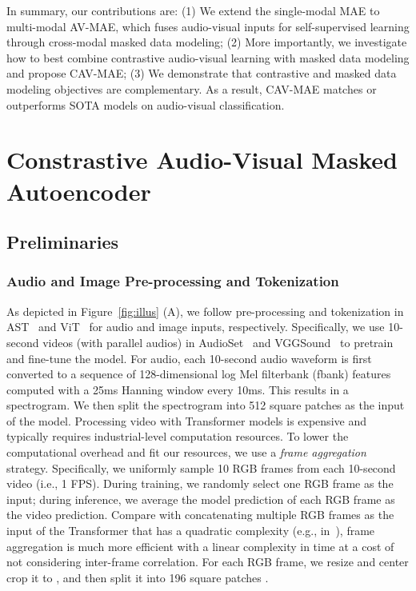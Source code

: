 \documentclass{article} \usepackage{iclr2023_conference,times}
\begin{document}
In summary, our contributions are: (1) We extend the single-modal MAE to multi-modal AV-MAE, which fuses audio-visual inputs for self-supervised learning through cross-modal masked data modeling;
(2) More importantly, we investigate how to best combine contrastive audio-visual learning with masked data modeling and propose CAV-MAE;
(3) We demonstrate that contrastive and masked data modeling objectives are complementary. As a result, CAV-MAE matches or outperforms SOTA models on audio-visual classification. 

\section{Constrastive Audio-Visual Masked Autoencoder}
\subsection{Preliminaries}
\subsubsection{Audio and Image Pre-processing and Tokenization}
\label{sec:preprocess}

As depicted in Figure~\ref{fig:illus} (A), we follow pre-processing and tokenization in AST~\citep{gong21b_interspeech} and ViT~\citep{dosovitskiy2020image} for audio and image inputs, respectively. Specifically, we use 10-second videos (with parallel audios) in AudioSet~\citep{gemmeke2017audio} and VGGSound~\citep{chen2020vggsound} to pretrain and fine-tune the model. For audio, each 10-second audio waveform is first converted to a sequence of 128-dimensional log Mel filterbank (fbank) features computed with a 25ms Hanning window every 10ms. This results in a  spectrogram. We then split the spectrogram into 512  square patches  as the input of the model. Processing video with Transformer models is expensive and typically requires industrial-level computation resources. To lower the computational overhead and fit our resources, we use a \emph{frame aggregation} strategy. Specifically, we uniformly sample 10 RGB frames from each 10-second video (i.e., 1 FPS). During training, we randomly select one RGB frame as the input; during inference, we average the model prediction of each RGB frame as the video prediction. Compare with concatenating multiple RGB frames as the input of the Transformer that has a quadratic complexity (e.g., in~\cite{nagrani2021attention}), frame aggregation is much more efficient with a linear complexity in time at a cost of not considering inter-frame correlation. For each RGB frame, we resize and center crop it to , and then split it into 196  square patches .
\end{document}
